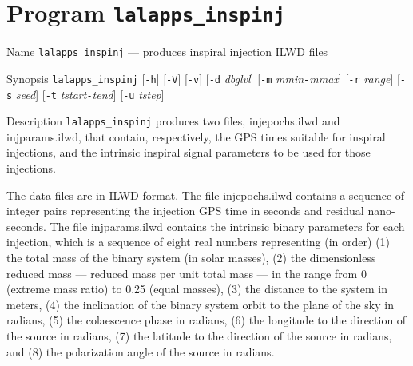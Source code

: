 \section{Program \texttt{lalapps\_inspinj}}
\label{program:lalapps-inspinj}

\begin{entry}

\item[Name]
\verb$lalapps_inspinj$ --- produces inspiral injection ILWD files

\item[Synopsis]
\verb$lalapps_inspinj$ [\verb$-h$] [\verb$-V$] [\verb$-v$]
[\verb$-d$ \textit{dbglvl}]
[\verb$-m$ \textit{mmin}\texttt{-}\textit{mmax}]
[\verb$-r$ \textit{range}]
[\verb$-s$ \textit{seed}]
[\verb$-t$ \textit{tstart}\texttt{-}\textit{tend}]
[\verb$-u$ \textit{tstep}]

\item[Description]
\verb$lalapps_inspinj$ produces  two  files,  injepochs.ilwd  and
injparams.ilwd,  that contain, respectively, the GPS times suitable for
inspiral injections, and the intrinsic inspiral signal parameters to be used
for those injections.

The  data  files  are  in  ILWD  format.   The  file injepochs.ilwd contains a
sequence of integer pairs representing  the  injection GPS time in seconds and
residual nano-seconds.  The file injparams.ilwd contains  the  intrinsic binary
parameters for each injection, which is a sequence of eight real numbers
representing  (in  order)  (1)  the total mass of the binary system (in solar
masses), (2) the dimensionless reduced mass --- reduced mass per unit  total
mass ---  in the range from 0 (extreme mass ratio) to 0.25 (equal masses), (3)
the distance to the system in  meters, (4)  the  inclination  of  the  binary
system orbit to the plane of the sky in radians, (5) the colaescence phase  in
radians,  (6) the longitude to the direction of the source in radians, (7) the
latitude  to  the  direction  of  the source  in  radians, and (8) the
polarization angle of the source in radians.



\end{entry}
